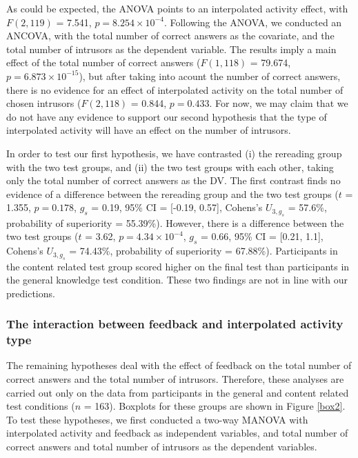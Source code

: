 \documentclass[11pt,]{article}
\begin{document}
As could be expected, the ANOVA points to an interpolated activity
effect, with \(F(2, 119)\) = 7.541, \(p = 8.254\times 10^{-4}\).
Following the ANOVA, we conducted an ANCOVA, with the total number of
correct answers as the covariate, and the total number of intrusors as
the dependent variable. The results imply a main effect of the total
number of correct answers (\(F(1, 118)\) = 79.674,
\(p = 6.873\times 10^{-15}\)), but after taking into acount the number
of correct answers, there is no evidence for an effect of interpolated
activity on the total number of chosen intrusors (\(F (2, 118)\) =
0.844, \(p = 0.433\). For now, we may claim that we do not have any
evidence to support our second hypothesis that the type of interpolated
activity will have an effect on the number of intrusors.

In order to test our first hypothesis, we have contrasted (i) the
rereading group with the two test groups, and (ii) the two test groups
with each other, taking only the total number of correct answers as the
DV. The first contrast finds no evidence of a difference between the
rereading group and the two test groups (\(t\) = 1.355, \(p = 0.178\),
\(g_s\) = 0.19, 95\% CI = {[}-0.19, 0.57{]}, Cohens's \(U_{3, g_s}\) =
57.6\%, probability of superiority = 55.39\%). However, there is a
difference between the two test groups (\(t\) = 3.62,
\(p = 4.34\times 10^{-4}\), \(g_s\) = 0.66, 95\% CI = {[}0.21, 1.1{]},
Cohens's \(U_{3, g_s}\) = 74.43\%, probability of superiority =
67.88\%). Participants in the content related test group scored higher
on the final test than participants in the general knowledge test
condition. These two findings are not in line with our predictions.

\hypertarget{the-interaction-between-feedback-and-interpolated-activity-type}{%
\subsubsection{The interaction between feedback and interpolated
activity
type}\label{the-interaction-between-feedback-and-interpolated-activity-type}}

The remaining hypotheses deal with the effect of feedback on the total
number of correct answers and the total number of intrusors. Therefore,
these analyses are carried out only on the data from participants in the
general and content related test conditions (\(n\) = 163). Boxplots for
these groups are shown in Figure \ref{box2}. To test these hypotheses,
we first conducted a two-way MANOVA with interpolated activity and
feedback as independent variables, and total number of correct answers
and total number of intrusors as the dependent variables.
\end{document}
